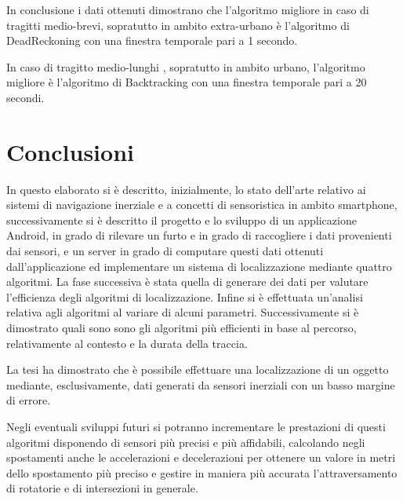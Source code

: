 \documentclass[12pt,a4paper,openright,twoside]{report}
\begin{document}
\medskip
In conclusione i dati ottenuti dimostrano che l'algoritmo migliore in caso di tragitti medio-brevi, sopratutto in ambito extra-urbano è l'algoritmo di DeadReckoning con una finestra temporale pari a 1 secondo. 

In caso di tragitto medio-lunghi , sopratutto in ambito urbano, l'algoritmo migliore è l'algoritmo di Backtracking con una finestra temporale pari a 20 secondi.

\clearpage{\pagestyle{empty}\cleardoublepage}
\chapter*{Conclusioni}

In questo elaborato si è descritto, inizialmente, lo stato dell'arte relativo ai sistemi di navigazione inerziale e a concetti di sensoristica in ambito smartphone, successivamente si è descritto il progetto e lo sviluppo di un applicazione Android, in grado di rilevare un furto e in grado di raccogliere i dati provenienti dai sensori, e un server in grado di computare questi dati ottenuti dall'applicazione ed implementare un sistema di localizzazione mediante quattro algoritmi. La fase successiva è stata quella di generare dei dati per valutare l'efficienza degli algoritmi di localizzazione. Infine si è effettuata un'analisi relativa agli algoritmi al variare di alcuni parametri. Successivamente si è dimostrato quali sono sono gli algoritmi più efficienti in base al percorso, relativamente al contesto e la durata della traccia.

La tesi ha dimostrato che è possibile effettuare una localizzazione di un oggetto mediante, esclusivamente, dati generati da sensori inerziali con un basso margine di errore. 

Negli eventuali sviluppi futuri si potranno incrementare le prestazioni di questi algoritmi disponendo di sensori più precisi e più affidabili, calcolando negli spostamenti anche le accelerazioni e decelerazioni per ottenere un valore in metri dello spostamento più preciso e gestire in maniera più accurata l'attraversamento di rotatorie e di intersezioni in generale.
\end{document}
